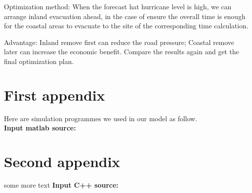 \documentclass{mcmthesis}
\begin{document}
Optimization method: When the forecast hat hurricane level is high, we can arrange inland evacuation ahead, in the case of ensure the overall time is enough for the coastal areas to evacuate to the site of the corresponding time calculation.

Advantage: Inland remove first can reduce the road pressure; Coastal remove later can increase the economic benefit. Compare the results again and get the final optimization plan.




\begin{appendices}

\section{First appendix}

\lipsum[13]

Here are simulation programmes we used in our model as follow.\\

\textbf{\textcolor[rgb]{0.98,0.00,0.00}{Input matlab source:}}
% 

\section{Second appendix}

some more text \textcolor[rgb]{0.98,0.00,0.00}{\textbf{Input C++ source:}}
% 

\end{appendices}
\end{document}
